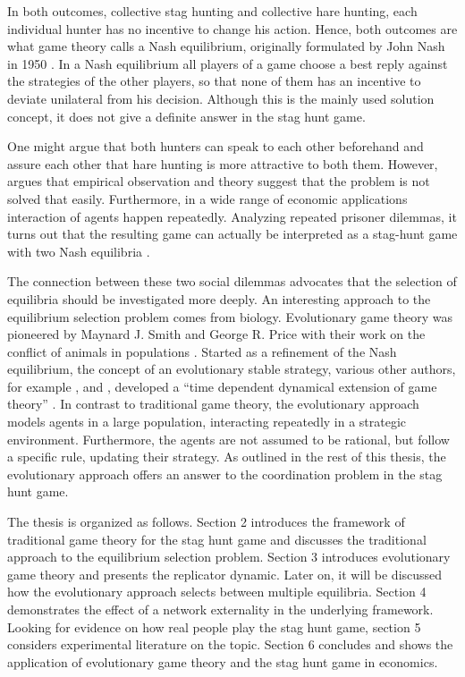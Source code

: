 In both outcomes, collective stag hunting and collective hare hunting,
each individual hunter has no incentive to change his action.
Hence, both outcomes are what game theory calls a Nash equilibrium, originally
formulated by John Nash in 1950 \parencite{nash_equilibrium_1950}. In a 
Nash equilibrium all players of a game choose a best reply against
the strategies of the other players, so that none of them has an incentive
to deviate unilateral from his decision. Although this is the mainly used
solution concept, it does not give a definite answer in the stag hunt game.

One might argue that both hunters can speak to each other beforehand and
assure each other that hare hunting is more attractive to both them. 
However, \textcite{camerer_behavioral_2003}
argues that empirical observation and theory suggest that the problem is 
not solved that easily.
Furthermore, in a wide range of economic applications interaction of agents
happen repeatedly. Analyzing repeated prisoner dilemmas, it turns 
out that the resulting game can actually be interpreted as a stag-hunt game with
two Nash equilibria \parencite{skyrms_stag_2004}.

The connection between these two social dilemmas advocates that
the selection of equilibria should be investigated more deeply. 
An interesting approach to the equilibrium selection problem comes from
biology. Evolutionary game theory was pioneered by Maynard J. Smith and George
R. Price with their work on the conflict of animals in populations 
\parencite{smith_lhe_1973}. Started as a refinement of the Nash equilibrium,
the concept of an evolutionary stable strategy, various other authors, for 
example \textcite{taylor_evolutionary_1978}, \textcite{hofbauer_note_1979} and
\textcite{zeeman_dynamics_1981}, developed a ``time dependent dynamical
extension of game theory'' \parencite[55]{hanauske_evolutionare_2011}.
In contrast to traditional game theory, the evolutionary approach  models
agents in a large population, interacting repeatedly in a strategic environment. 
Furthermore, the agents are not assumed to be rational, but follow a specific 
rule, updating their strategy. 
As outlined in the rest of this thesis, the
evolutionary approach offers an answer to the coordination
problem in the stag hunt game.

The thesis is organized as follows. Section 2 introduces the 
framework of traditional game theory for the stag hunt game and discusses
the traditional approach to the equilibrium selection problem. Section 3
introduces evolutionary game theory and presents the replicator dynamic. 
Later on, it will be discussed how the evolutionary approach selects
between multiple equilibria. Section 4 demonstrates the effect of a
network externality in the underlying framework. Looking for evidence on
how real people play the stag hunt game, section 5 considers experimental
literature on the topic. Section 6 concludes and shows the application of
evolutionary game theory and the stag hunt game in economics.

